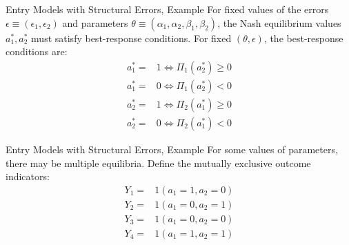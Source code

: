 \documentclass[xcolor=pdftex,dvipsnames,table,mathserif]{beamer}
\begin{document}
\begin{frame}{Entry Models with Structural Errors, Example}
For fixed values of the errors $\epsilon \equiv (\epsilon_1, \epsilon_2)$ and parameters $\theta \equiv (\alpha_1, \alpha_2, \beta_1, \beta_2)$, the Nash equilibrium values $a^*_1, a^*_2$ must satisfy best-response conditions. For fixed $(\theta, \epsilon)$, the best-response conditions are:
\begin{equation*}
\begin{split}
a^*_1 = & 1 \Leftrightarrow \Pi_1 (a^*_2) \geq 0 \\
a^*_1 = & 0 \Leftrightarrow \Pi_1 (a^*_2) < 0 \\
a^*_2 = & 1 \Leftrightarrow \Pi_2 (a^*_1) \geq 0 \\
a^*_2 = & 0 \Leftrightarrow \Pi_2 (a^*_1) < 0
\end{split}
\end{equation*}
\end{frame}

\begin{frame}{Entry Models with Structural Errors, Example}
For some values of parameters, there may be multiple equilibria. Define the mutually exclusive outcome indicators:
\begin{equation*}
\begin{split}
Y_1 = & 1 (a_1 = 1, a_2 = 0) \\
Y_2 = & 1 (a_1 = 0, a_2 = 1) \\
Y_3 = & 1 (a_1 = 0, a_2 = 0) \\
Y_4 = & 1 (a_1 = 1, a_2 = 1) 
\end{split}
\end{equation*}
\end{frame}
\end{document}
